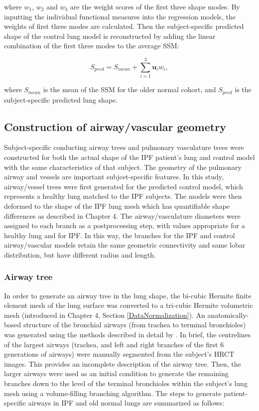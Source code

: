 \noindent where $w_1$, $w_2$ and $w_3$ are the weight scores of the first three shape modes. By inputting the individual functional measures into the regression models, the weights of first three modes are calculated. Then the subject-specific predicted shape of the control lung model is reconstructed by adding the linear combination of the first three modes to the average SSM:

\begin{equation}
 \label{eq:NormalLungPrediction}
 S_{pred} = S_{mean} + \sum_{i=1}^3 \mathbf{u}_i w_{i},
\end{equation}

\noindent where $S_{mean}$ is the mean of the SSM for the older normal cohort, and $S_{pred}$ is the subject-specific predicted lung shape. 

\subsection{Construction of airway/vascular geometry} \label{AirwayVesselGeometry}
Subject-specific conducting airway trees and pulmonary vasculature trees were constructed for both the actual shape of the IPF patient's lung and control model with the same characteristics of that subject. The geometry of the pulmonary airway and vessels are important subjcet-specific features. In this study, airway/vessel trees were first generated for the predicted control model, which represents a healthy lung matched to the IPF subjects. The models were then deformed to the shape of the IPF lung mesh which has quantifiable shape differences as described in Chapter 4. The airway/vasculature diameters were assigned to each branch as a postprocessing step, with values appropriate for a healthy lung and for IPF. In this way, the branches for the IPF and control airway/vascular models retain the same geometric connectivity and same lobar distribution, but have different radius and length. 

\subsubsection{Airway tree}
In order to generate an airway tree in the lung shape, the bi-cubic Hermite finite element mesh of the lung surface was converted to a tri-cubic Hermite volumetric mesh (introduced in Chapter 4, Section \ref{DataNormalization}). An anatomically-based structure of the bronchial airways (from trachea to terminal bronchioles) was generated using the methods described in detail by \cite{tawhai2004ct}. In brief, the centrelines of the largest airways (trachea, and left and right branches of the first 6 generations of airways) were manually segmented from the subject's HRCT images. This provides an incomplete description of the airway tree. Then, the larger airways were used as an initial condition to generate the remaining branches down to the level of the terminal bronchioles within the subject's lung mesh using a volume-filling branching algorithm. The steps to generate patient-specific airways in IPF and old normal lungs are summarized as follows:

